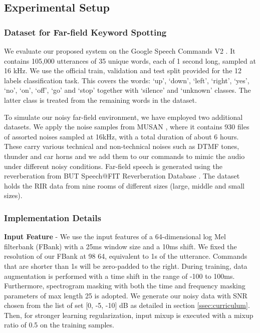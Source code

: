 \documentclass{article}
\begin{document}
\subsection{Experimental Setup}
\label{ssec:setup}

\subsubsection{Dataset for Far-field Keyword Spotting}
\label{sssec: dataset}
We evaluate our proposed system on the Google Speech Commands V2 \cite{speechcommandsv2}. It contains 105,000 utterances of 35 unique words, each of 1 second long, sampled at 16 kHz. We use the official train, validation and test split provided for the 12 labels classification task. This covers the words: `up', `down', `left', `right', `yes', `no', `on', `off', `go' and `stop' together with `silence' and `unknown' classes. The latter class is treated from the remaining words in the dataset.

To simulate our noisy far-field environment, we have employed two additional datasets. We apply the noise samples from MUSAN \cite{musan}, where it contains 930 files of assorted noises sampled at 16kHz, with a total duration of about 6 hours. These carry various
technical and non-technical noises such as DTMF tones, thunder and car horns and we add them to our commands to mimic the audio under different noisy conditions. 
Far-field speech is generated using the reverberation from BUT Speech@FIT Reverberation Database \cite{RIRdata}. The dataset holds the RIR data from nine rooms of different sizes (large, middle and small sizes). 











\subsubsection{Implementation Details}
\label{sssec: preprocessing}
\textbf{Input Feature} - We use the input features of a 64-dimensional log Mel filterbank (FBank) with a 25ms window size and a 10ms shift. We fixed the resolution of our FBank at 98  64, equivalent to 1s of the utterance. Commands that are shorter than 1s will be zero-padded to the right. During training, data augmentation is performed with a time shift in the range of -100 to 100ms. Furthermore, spectrogram masking with both the time and frequency masking parameters of max length 25 is adopted. We generate our noisy data with SNR chosen from the list of set [0, -5, -10] dB as detailed in section \ref{ssec:curriculum}. Then, for stronger learning regularization, input mixup is executed with a mixup ratio of 0.5 on the training samples.
\end{document}
